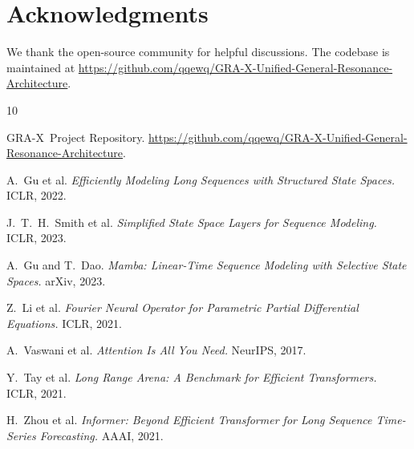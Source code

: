 \documentclass{article}
\newcommand{\GRA}{\textsc{GRA-X}}
\begin{document}
\section*{Acknowledgments}
We thank the open-source community for helpful discussions. The codebase is maintained at \url{https://github.com/qqewq/GRA-X-Unified-General-Resonance-Architecture}.


\begin{thebibliography}{10}

\GRA\ Project Repository.
\url{https://github.com/qqewq/GRA-X-Unified-General-Resonance-Architecture}.

A.~Gu et al.
\emph{Efficiently Modeling Long Sequences with Structured State Spaces.}
ICLR, 2022.

J.~T.~H.~Smith et al.
\emph{Simplified State Space Layers for Sequence Modeling.}
ICLR, 2023.

A.~Gu and T.~Dao.
\emph{Mamba: Linear-Time Sequence Modeling with Selective State Spaces.}
arXiv, 2023.

Z.~Li et al.
\emph{Fourier Neural Operator for Parametric Partial Differential Equations.}
ICLR, 2021.

A.~Vaswani et al.
\emph{Attention Is All You Need.}
NeurIPS, 2017.

Y.~Tay et al.
\emph{Long Range Arena: A Benchmark for Efficient Transformers.}
ICLR, 2021.

H.~Zhou et al.
\emph{Informer: Beyond Efficient Transformer for Long Sequence Time-Series Forecasting.}
AAAI, 2021.

\end{thebibliography}
\end{document}
